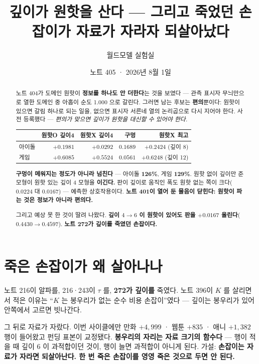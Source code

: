 \documentclass[11pt]{article}
\begin{document}
\title{깊이가 원핫을 산다 --- 그리고 죽었던 손잡이가 자료가 자라자 되살아났다}
\author{월드모델 실험실}
\date{노트 405 · 2026년 8월 1일}
\maketitle

\begin{abstract}
노트 404가 도메인 원핫이 \textbf{정보를 하나도 안 더한다}는 것을 보였다 ---
관측 표시자 무늬만으로 열한 도메인 중 아홉이 순도 1.000 으로 갈린다.
그러면 남는 후보는 \textbf{편의}뿐이다: 원핫이 있으면 갈림 하나로 되는 일을,
없으면 표시자 서른네 열의 논리곱으로 다시 지어야 한다. 사전 등록했다 ---
\emph{편의가 맞으면 깊이가 원핫을 대신할 수 있어야 한다.}

\begin{center}
\begin{tabular}{lrrrr}
\hline
 & 원핫O 깊이4 & 원핫X 깊이4 & 구멍 & \textbf{원핫X 최고} \\
\hline
아이돌 & $+0.1981$ & $+0.0292$ & $0.1689$ & $\mathbf{+0.2424}$ (깊이 8) \\
게임 & $+0.6085$ & $+0.5524$ & $0.0561$ & $\mathbf{+0.6248}$ (깊이 12) \\
\hline
\end{tabular}
\end{center}

\textbf{구멍이 메워지는 정도가 아니라 넘친다} --- 아이돌 \textbf{126\%},
게임 \textbf{129\%}. 원핫 없이 깊이만 준 모형이 원핫 있는 깊이 4 모형을
\textbf{이긴다.} 판이 깊이로 움직인 폭도 원핫 없는 쪽이 크다($0.0224$ 대
$0.0167$) --- 예측한 상호작용이다. \textbf{노트 401이 열어 둔 물음이
닫힌다: 원핫이 파는 것은 정보가 아니라 편의다.}

그리고 예상 못 한 것이 딸려 나왔다. \textbf{깊이 $4 \to 6$ 이 원핫이 있어도
판을 $+0.0167$ 올린다}($0.4430 \to 0.4597$). \textbf{노트 272가 깊이를
죽였던 손잡이다.}
\end{abstract}

\section{죽은 손잡이가 왜 살아나나}

노트 216이 알파를, 216·243이 $\tau$ 를, \textbf{272가 깊이를} 죽였다.
노트 396이 $K$ 를 살리면서 적은 이유는 ``$K$ 는 봉우리가 없는 순수 비용
손잡이''였다 --- 깊이는 봉우리가 있어 안쪽에서 고르면 빗나간다.

그 뒤로 자료가 자랐다. 이번 사이클에만 만화 $+4{,}999$ · 웹툰 $+835$ ·
애니 $+1{,}382$ 행이 들어왔고 펀딩 표본이 교정됐다. \textbf{봉우리의
자리는 자료 크기의 함수다} --- 행이 적을 때 깊이 6 이 과적합이던 것이,
행이 늘면 과적합이 아니게 된다. 가설: \textbf{손잡이는 자료가 자라면
되살아난다. 한 번 죽은 손잡이를 영영 죽은 것으로 두면 안 된다.}
\end{document}
